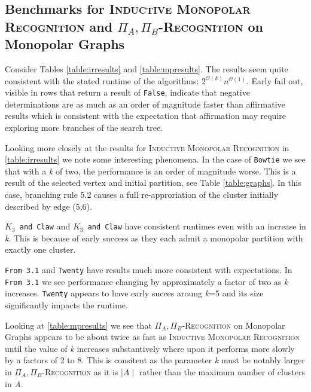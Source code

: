 \documentclass[11pt]{article}
\newcommand{\inlinecode}{\texttt}
\newcommand{\Oh}{{\mathcal O}}
\begin{document}
\subsection{Benchmarks for \textsc{Inductive Monopolar Recognition} and \textsc{$\Pi_A,\Pi_B$-Recognition} on Monopolar Graphs}
\label{subsec:executiondata}

Consider Tables \ref{table:irresults} and \ref{table:mpresults}. The results seem quite consistent with the stated runtime of the algorithms: $2^{\Oh(k)}n^{\Oh(1)}$. Early fail out, visible in rows that return a result of \inlinecode{False}, indicate that negative determinations are as much as an order of magnitude faster than affirmative results which is consistent with the expectation that affirmation may require exploring more branches of the search tree.

Looking more closely at the results for \textsc{Inductive Monopolar Recognition} in \ref{table:irresults} we note some interesting phenomena. In the case of \inlinecode{Bowtie} we see that with a \textit{k} of two, the performance is an order of magnitude worse. This is a result of the selected vertex and initial partition, see Table \ref{table:graphs}. In this case, branching rule 5.2 causes a full re-approriation of the cluster initially described by edge (5,6).

\inlinecode{$K_3$ and Claw} and \inlinecode{$K_3$ and Claw} have consistent runtimes even with an increase in \textit{k}. This is because of early success as they each admit a monopolar partition with exactly one cluster.

\inlinecode{From 3.1} and \inlinecode{Twenty} have results much more consistent with expectations. In \inlinecode{From 3.1} we see performance changing by approximately a factor of two as \textit{k} increases. \inlinecode{Twenty} appears to have early succes aroung \textit{k}=5 and its size significantly impacts the runtime.

Looking at \ref{table:mpresults} we see that \textsc{$\Pi_A,\Pi_B$-Recognition} on Monopolar Graphs appears to be about twice as fast as \textsc{Inductive Monopolar Recognition} until the value of \textit{k} increases substantively where upon it performs more slowly by a factors of 2 to 8. This is consitent as the parameter \textit{k} must be notably larger in \textsc{$\Pi_A,\Pi_B$-Recognition} as it is $\mid\textit{A}\mid$ rather than the maximum number of clusters in \textit{A}.
\end{document}
